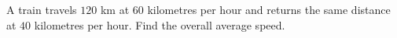 A train travels $120$ km at $60$ kilometres per hour and returns the same distance at $40$ kilometres per hour. Find the overall average speed.
